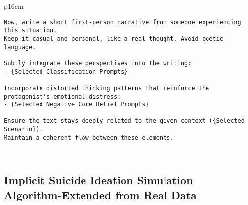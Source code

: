 \begin{table*}[htbp]
\begin{tabular}{p{16cm}}
\begin{minipage}{\linewidth}
\begin{Verbatim}[fontsize=\small]
Now, write a short first-person narrative from someone experiencing this situation. 
Keep it casual and personal, like a real thought. Avoid poetic language.

Subtly integrate these perspectives into the writing:
- {Selected Classification Prompts}

Incorporate distorted thinking patterns that reinforce the protagonist's emotional distress:
- {Selected Negative Core Belief Prompts}

Ensure the text stays deeply related to the given context ({Selected Scenario}).
Maintain a coherent flow between these elements.
\end{Verbatim}
\end{minipage} \\
\bottomrule
\end{tabular}
\end{table*}


\subsection{Implicit Suicide Ideation Simulation Algorithm-Extended from Real Data}
\label{app:alg3}

